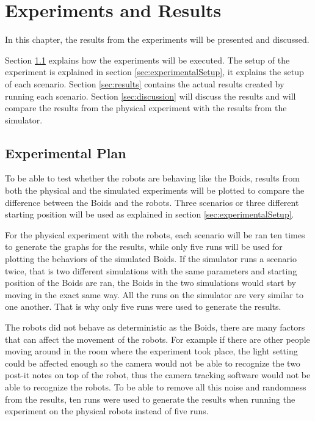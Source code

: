 \chapter{Experiments and Results}
\label{cha:ResearchAndResults}

In this chapter, the results from the experiments will be presented and discussed. 

Section \ref{sec:experimentalPlan} explains how the experiments will be executed. 
The setup of the experiment is explained in section \ref{sec:experimentalSetup}, it explains the setup of each scenario.
Section \ref{sec:results} contains the actual results created by running each scenario. 
Section \ref{sec:discussion} will discuss the results and will compare the results from the physical experiment with the results from the simulator.

\section{Experimental Plan}
\label{sec:experimentalPlan}
To be able to test whether the robots are behaving like the Boids, results from both the physical and the simulated experiments will be plotted to compare the difference between the Boids and the robots. Three scenarios or three different starting position will be used as explained in section \ref{sec:experimentalSetup}.

For the physical experiment with the robots, each scenario will be ran ten times to generate the graphs for the results, while only five runs will be used for plotting the behaviors of the simulated Boids. 
If the simulator runs a scenario twice, that is two different simulations with the same parameters and starting position of the Boids are ran, the Boids in the two simulations would start by moving in the exact same way. All the runs on the simulator are very similar to one another. That is why only five runs were used to generate the results. 

The robots did not behave as deterministic as the Boids, there are many factors that can affect the movement of the robots. For example if there are other people moving around in the room where the experiment took place, the light setting could be affected enough so the camera would not be able to recognize the two post-it notes on top of the robot, thus the camera tracking software would not be able to recognize the robots.
To be able to remove all this noise and randomness from the results, ten runs were used to generate the results when running the experiment on the physical robots instead of five runs. 


